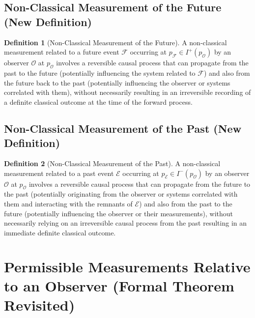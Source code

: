 \documentclass{article}
\theoremstyle{definition}
\newtheorem{definition}{Definition}[section]
\begin{document}
	\subsection{Non-Classical Measurement of the Future (New Definition)}
	
	\begin{definition}[Non-Classical Measurement of the Future]
		A non-classical measurement related to a future event $\mathcal{F}$ occurring at $p_{\mathcal{F}} \in I^+(p_{\mathcal{O}})$ by an observer $\mathcal{O}$ at $p_{\mathcal{O}}$ involves a reversible causal process that can propagate from the past to the future (potentially influencing the system related to $\mathcal{F}$) and also from the future back to the past (potentially influencing the observer or systems correlated with them), without necessarily resulting in an irreversible recording of a definite classical outcome at the time of the forward process.
	\end{definition}
	
	\subsection{Non-Classical Measurement of the Past (New Definition)}
	
	\begin{definition}[Non-Classical Measurement of the Past]
		A non-classical measurement related to a past event $\mathcal{E}$ occurring at $p_{\mathcal{E}} \in I^-(p_{\mathcal{O}})$ by an observer $\mathcal{O}$ at $p_{\mathcal{O}}$ involves a reversible causal process that can propagate from the future to the past (potentially originating from the observer or systems correlated with them and interacting with the remnants of $\mathcal{E}$) and also from the past to the future (potentially influencing the observer or their measurements), without necessarily relying on an irreversible causal process from the past resulting in an immediate definite classical outcome.
	\end{definition}
	
	\section{Permissible Measurements Relative to an Observer (Formal Theorem Revisited)}
	
\end{document}
